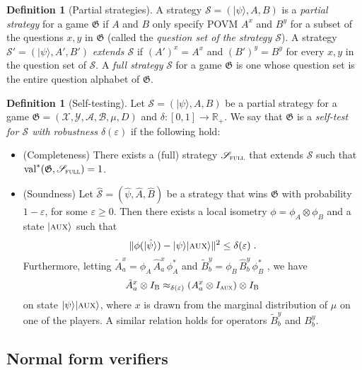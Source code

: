 \documentclass[11pt]{article}
\theoremstyle{definition}
\newtheorem{definition}[theorem]{Definition}
\newcommand{\ket}[1]{|#1\rangle}
\newcommand{\Id}{\ensuremath{I}}
\newcommand{\R}{\ensuremath{\mathbb{R}}}
\newcommand{\val}{\ensuremath{\mathrm{val}}}
\newcommand{\eps}{\varepsilon}
\newcommand{\game}{\mathfrak{G}}
\newcommand{\strategy}{\mathscr{S}}
\newcommand{\labelstyle}[1]{\ensuremath{\textsc{#1}}\xspace}
\newcommand{\aux}{\labelstyle{aux}}
\newcommand{\full}{\labelstyle{full}}
\newcommand{\bob}{\labelstyle{B}}
\renewcommand{\cal}[1]{\mathcal{#1}}
\begin{document}
\begin{definition}[Partial strategies]
  A strategy $\strategy = (\ket{\psi}, A, B)$ is a \emph{partial strategy} for a
  game $\game$ if $A$ and $B$ only specify POVM $A^x$ and $B^y$ for a subset of
  the questions $x, y$ in $\game$ (called the \emph{question set of the strategy
    $\strategy$}).
  A strategy $\strategy' = (\ket{\psi}, A', B')$ \emph{extends $\strategy$} if
  $(A')^x = A^x$ and $(B')^y = B^y$ for every $x, y$ in the question set of
  $\strategy$.
  A \emph{full strategy} $\strategy$ for a game $\game$ is one whose question
  set is the entire question alphabet of $\game$.
\end{definition}

\begin{definition}[Self-testing]
  Let $\strategy = (\ket{\psi}, A, B)$ be a partial strategy for a game $\game =
  (\cal{X}, \cal{Y}, \cal{A},  \cal{B}, \mu, D)$ and $\delta:[0,1]\to \R_+$.
  We say that $\game$ is a \emph{self-test for $\strategy$ with robustness
    $\delta(\eps)$} if the following hold:
  \begin{itemize}
	\item (Completeness)
    There exists a (full) strategy $\strategy_{\full}$ that extends $\strategy$
    such that $\val^*(\game, \strategy_{\full}) = 1$.
	\item (Soundness)
    Let $\hat{\strategy} = (\hat{\psi}, \hat{A}, \hat{B})$ be a strategy that
    wins $\game$ with probability $1 - \eps$, for some $\eps\geq 0$.
    Then there exists a local isometry $\phi = \phi_A \otimes \phi_B$ and a
    state $\ket{\aux}$ such that
    \begin{equation*}
      \| \phi (\ket{\hat{\psi}}) - \ket{\psi} \ket{\aux} \|^2 \leq \delta(\eps)\;.
    \end{equation*}
    Furthermore, letting $\tilde{A}^x_a = \phi_A\, \hat{A}^x_a\, \phi_A^*$ and
    $\tilde{B}^y_b = \phi_B\, \hat{B}^y_b\, \phi_B^*$ , we have
    \begin{equation*}
      \tilde{A}^x_a \otimes I_\bob \approx_{\delta(\eps)}
      (A^x_a \otimes \Id_\aux) \otimes I_\bob
    \end{equation*}
    on state $\ket{\psi} \ket{\aux}$, where $x$ is drawn from the
    marginal distribution of $\mu$ on one of the players.
    A similar relation holds for operators $\tilde{B}^y_b$ and $B^y_b$.
  \end{itemize}
\end{definition}


\subsection{Normal form verifiers}
\label{sec:normal-form}
\end{document}

